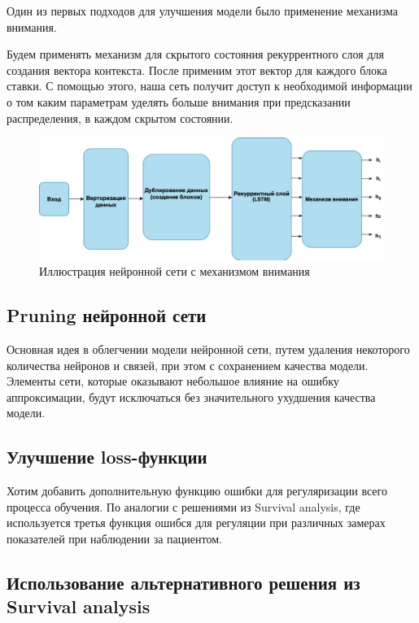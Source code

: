 \documentclass[times,specification,annotation]{itmo-student-thesis}
\begin{document}
Один из первых подходов для улучшения модели было применение механизма внимания.

Будем применять механизм для скрытого состояния рекуррентного слоя для создания вектора контекста. 
После применим этот вектор для каждого блока ставки. 
С помощью этого, наша сеть получит доступ к необходимой информации 
о том каким параметрам уделять больше внимания при предсказании распределения, в каждом скрытом состоянии.

\begin{figure}[h]
    \caption{Иллюстрация нейронной сети с механизмом внимания}
    \centering
    \includegraphics{nn_attention.png}
\end{figure}

\subsection{Pruning нейронной сети}

Основная идея в облегчении модели нейронной сети, путем удаления некоторого количества нейронов и связей, при этом с сохранением качества модели. 
Элементы сети, которые оказывают небольшое влияние на ошибку аппроксимации, будут исключаться без значительного ухудшения качества модели.

\subsection{Улучшение loss-функции}

Хотим добавить дополнительную функцию ошибки для регуляризации всего процесса обучения. 
По аналогии с решениями из Survival analysis, где используется третья функция ошибся для регуляции 
при различных замерах показателей при наблюдении за пациентом.

\subsection{Использование альтернативного решения из Survival analysis}
\end{document}
